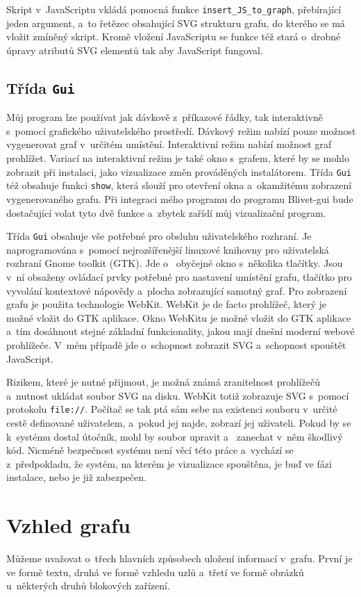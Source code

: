 \documentclass[color,table,oneside,nolot,nolof]{fithesis}
\begin{document}
	Skript v~JavaScriptu vkládá pomocná funkce \texttt{insert\_JS\_to\_graph}, přebírající jeden argument, a~to řetězec obsahující SVG strukturu grafu, do kterého se má vložit zmíněný skript. 
	Kromě vložení JavaScriptu se funkce též stará o~drobné úpravy atributů SVG elementů tak aby JavaScript fungoval. 

\section{Třída \texttt{Gui}}
	Můj program lze používat jak dávkově z~příkazové řádky, tak interaktivně s~pomocí grafického uživatelského prostředí. Dávkový režim nabízí pouze možnost vygenerovat graf v~určitém 
	umístění. Interaktivní režim nabízí možnost graf prohlížet. Variací na interaktivní režim je také okno s~grafem, které by se mohlo zobrazit při instalaci, jako vizualizace změn prováděných
	instalátorem. Třída \texttt{Gui} též obsahuje funkci \texttt{show}, která slouží pro otevření okna a~okamžitému zobrazení vygenerovaného grafu. 
	Při integraci mého programu do programu Blivet-gui bude dostačující volat tyto dvě funkce a~zbytek zařídí můj vizualizační program.

	Třída \texttt{Gui} obsahuje vše potřebné pro obsluhu uživatelského rozhraní. Je naprogramována s~pomocí nejrozšířenější linuxové knihovny pro uživatelská rozhraní Gnome toolkit (GTK). Jde o~
	obyčejné okno s~několika tlačítky. Jsou v~ní obsaženy ovládací prvky potřebné pro nastavení umístění grafu, tlačítko pro vyvolání kontextové
	nápovědy a~plocha zobrazující samotný graf. Pro zobrazení grafu je použita technologie WebKit. WebKit je de facto prohlížeč, který je možné vložit do GTK aplikace.
	Okno WebKitu je možné vložit do GTK aplikace a~tím dosáhnout stejné základní funkcionality,
	jakou mají dnešní moderní webové prohlížeče. V~mém případě jde o~schopnost zobrazit SVG a~schopnost spouštět JavaScript.

	Rizikem, které je nutné přijmout, je možná známá zranitelnost prohlížečů a~nutnost ukládat soubor SVG na disku. WebKit totiž zobrazuje SVG s~pomocí protokolu \texttt{file://}. Počítač se
	tak ptá sám sebe na existenci souboru v~určité cestě definované uživatelem, a~pokud jej najde, zobrazí jej uživateli. Pokud by se k~systému dostal útočník, mohl by soubor upravit a~
	zanechat v~něm škodlivý kód. Nicméně bezpečnost systému není věcí této práce a~vychází se z~předpokladu, že systém, na kterém je vizualizace spouštěna, je buď ve fázi instalace, nebo
	je již zabezpečen. 

\chapter{Vzhled grafu}
  Můžeme uvažovat o~třech hlavních způsobech uložení informací v~grafu. První je ve formě textu, druhá ve formě vzhledu uzlů a~třetí ve formě obrázků 
	u~některých druhů blokových zařízení. 
\end{document}
